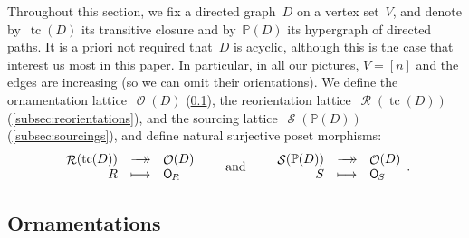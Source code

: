 \documentclass{amsart}
\theoremstyle{definition}
\renewcommand{\c}[1]{\mathcal{#1}} %
\newcommand{\surjection}{\longrightarrow\mathrel{\mkern-22mu}\rightarrow\,}
\DeclareMathOperator{\tc}{tc} %
\newcommand{\mymap}[2]{\mathsf{#1}_{\hspace{-.7pt}#2}}
\DeclareMathOperator{\Orn}{\c{O}}  %
\newcommand{\orn}[1]{\mymap{O}{#1}}  %
\DeclareMathOperator{\Reori}{\c{R}}  %
\DeclareMathOperator{\Sour}{\mathcal{S}}  %
\newcommand{\PP}{\mathbb P} %
\begin{document}
Throughout this section, we fix a directed graph~$D$ on a vertex set~$V$, and denote by~$\tc(D)$ its transitive closure and by~$\PP(D)$ its hypergraph of directed paths.
It is a priori not required that~$D$ is acyclic, although this is the case that interest us most in this paper.
In particular, in all our pictures, $V = [n]$ and the edges are increasing (so we can omit their orientations).
We define the ornamentation lattice~$\Orn(D)$ (\cref{subsec:ornamentations}), the reorientation lattice~$\Reori(\tc(D))$ (\cref{subsec:reorientations}), and the sourcing lattice~$\Sour(\PP(D))$ (\cref{subsec:sourcings}), and define natural surjective poset morphisms:
\[
\begin{array}{rcl}
	\Reori(\tc(D)) & \surjection & \Orn(D) \\
	R & \longmapsto & \orn{R}
\end{array}
\qquad\text{and}\qquad
\begin{array}{rcl}
	\Sour(\PP(D)) & \surjection & \Orn(D) \\
	S & \longmapsto & \orn{S}
\end{array}
.
\]


\subsection{Ornamentations}
\label{subsec:ornamentations}
\end{document}
